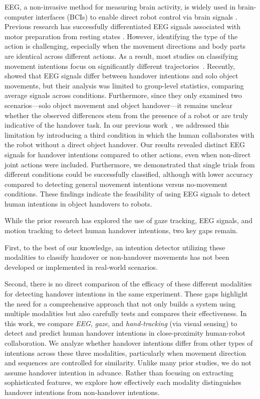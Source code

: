 EEG, a non-invasive method for measuring brain activity, is widely used in brain-computer interfaces (BCIs) to enable direct robot control via brain signals \cite{varbu2022past,lyu22, mondini2020continuous}. Previous research has successfully differentiated EEG signals associated with motor preparation from resting states \cite{MAMMONE2020source, 9534028}. However, identifying the type of the action is challenging, especially when the movement directions and body parts are identical across different actions. As a result, most studies on classifying movement intentions focus on significantly different trajectories~\cite{MAMMONE2020source, gordienko21, MOHSENI2020, ofner2019}. Recently, \cite{cooper20} showed that EEG signals differ between handover intentions and solo object movements, but their analysis was limited to group-level statistics, comparing average signals across conditions. Furthermore, since they only examined two scenarios—solo object movement and object handover—it remains unclear whether the observed differences stem from the presence of a robot or are truly indicative of the handover task. In our previous work~\cite{nonaEEG}, we addressed this limitation by introducing a third condition in which the human collaborates with the robot without a direct object handover. Our results revealed distinct EEG signals for handover intentions compared to other actions, even when non-direct joint actions were included. Furthermore, we demonstrated that single trials from different conditions could be successfully classified, although with lower accuracy compared to detecting general movement intentions versus no-movement conditions. These findings indicate the feasibility of using EEG signals to detect human intentions in object handovers to robots.

While the prior research has explored the use of gaze tracking, EEG signals, and motion tracking to detect human handover intentions, two key gaps remain. 

First, to the best of our knowledge, an intention detector utilizing these modalities to classify handover or non-handover movements has not been developed or implemented in real-world scenarios.

Second, there is no direct comparison of the efficacy of these different modalities for detecting handover intentions in the same experiment. These gaps highlight the need for a comprehensive approach that not only builds a system using multiple modalities but also carefully tests and compares their effectiveness.
In this work, we compare \emph{EEG}, \emph{gaze}, and \emph{hand-tracking} (via visual sensing) to detect and predict human handover intentions in close-proximity human-robot collaboration. We analyze whether handover intentions differ from other types of intentions across these three modalities, particularly when movement direction and sequences are controlled for similarity. Unlike many prior studies, we do not assume handover intention in advance. Rather than focusing on extracting sophisticated features, we explore how effectively each modality distinguishes handover intentions from non-handover intentions.